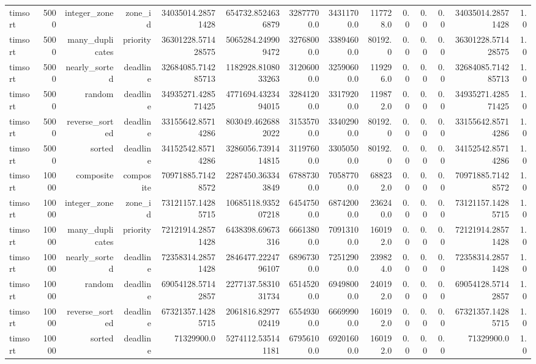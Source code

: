 \begin{table}[htbp]
\begin{tabular}{lrrrrrrrrrrrrr}
timsort & 5000 & integer_zone & zone_id & 34035014.28571428 & 654732.8524636879 & 32877700.0 & 34311700.0 & 117728.0 & 0.0 & 0.0 & 0.0 & 34035014.28571428 & 1.0 \\
timsort & 5000 & many_duplicates & priority & 36301228.571428575 & 5065284.249909472 & 32768000.0 & 33894600.0 & 80192.0 & 0.0 & 0.0 & 0.0 & 36301228.571428575 & 1.0 \\
timsort & 5000 & nearly_sorted & deadline & 32684085.714285713 & 1182928.8108033263 & 31206000.0 & 32590600.0 & 119296.0 & 0.0 & 0.0 & 0.0 & 32684085.714285713 & 1.0 \\
timsort & 5000 & random & deadline & 34935271.428571425 & 4771694.4323494015 & 32841200.0 & 33179200.0 & 119872.0 & 0.0 & 0.0 & 0.0 & 34935271.428571425 & 1.0 \\
timsort & 5000 & reverse_sorted & deadline & 33155642.85714286 & 803049.4626882022 & 31535700.0 & 33402900.0 & 80192.0 & 0.0 & 0.0 & 0.0 & 33155642.85714286 & 1.0 \\
timsort & 5000 & sorted & deadline & 34152542.85714286 & 3286056.7391414815 & 31197600.0 & 33050500.0 & 80192.0 & 0.0 & 0.0 & 0.0 & 34152542.85714286 & 1.0 \\
timsort & 10000 & composite & composite & 70971885.71428572 & 2287450.363343849 & 67887300.0 & 70587700.0 & 688232.0 & 0.0 & 0.0 & 0.0 & 70971885.71428572 & 1.0 \\
timsort & 10000 & integer_zone & zone_id & 73121157.14285715 & 10685118.935207218 & 64547500.0 & 68742000.0 & 236240.0 & 0.0 & 0.0 & 0.0 & 73121157.14285715 & 1.0 \\
timsort & 10000 & many_duplicates & priority & 72121914.28571428 & 6438398.69673316 & 66613800.0 & 70913100.0 & 160192.0 & 0.0 & 0.0 & 0.0 & 72121914.28571428 & 1.0 \\
timsort & 10000 & nearly_sorted & deadline & 72358314.28571428 & 2846477.2224796107 & 68967300.0 & 72512900.0 & 239824.0 & 0.0 & 0.0 & 0.0 & 72358314.28571428 & 1.0 \\
timsort & 10000 & random & deadline & 69054128.57142857 & 2277137.5831031734 & 65145200.0 & 69498000.0 & 240192.0 & 0.0 & 0.0 & 0.0 & 69054128.57142857 & 1.0 \\
timsort & 10000 & reverse_sorted & deadline & 67321357.14285715 & 2061816.8297702419 & 65549300.0 & 66699900.0 & 160192.0 & 0.0 & 0.0 & 0.0 & 67321357.14285715 & 1.0 \\
timsort & 10000 & sorted & deadline & 71329900.0 & 5274112.535141181 & 67956100.0 & 69201600.0 & 160192.0 & 0.0 & 0.0 & 0.0 & 71329900.0 & 1.0 \\

\end{tabular}
\end{table}
